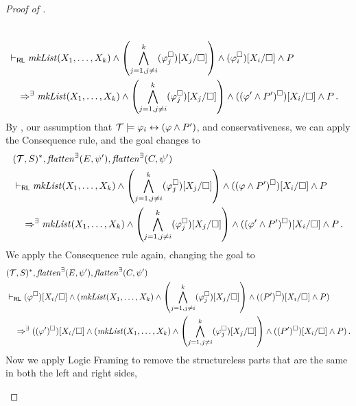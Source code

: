 \begin{proof}[Proof of ]
\begin{enumerate}
\begin{align*}
        \\& \vdash_{\mathsf{RL}}
        \mathit{mkList}(X_1, \ldots, X_k) \land \left( \bigwedge_{j=1,j\not = i}^{k} (\varphi_j^\square)[X_j/\square] \right)
        \land (\varphi_i^\square)[X_i/\square] \land P
        \\&\quad \Rightarrow^\exists
        \mathit{mkList}(X_1, \ldots, X_k) \land \left( \bigwedge_{j=1, j \not = i}^{k} (\varphi_j^\square)[X_j/\square] \right) \land ((\varphi^\prime \land P^\prime)^\square)[X_i/\square] \land P
        \, .
    \end{align*}
    By , our assumption that $\mathcal{T} \models \varphi_i \leftrightarrow (\varphi \land P^\prime)$,
    and conservativeness,
    we can apply the Consequence rule, and the goal changes to
    \begin{align*}
        & (\mathcal{T}, S)^*, \mathit{flatten}^\exists(E, \psi^\prime), \mathit{flatten}^\exists(C, \psi^\prime)
        \\& \vdash_{\mathsf{RL}}
        \mathit{mkList}(X_1, \ldots, X_k) \land \left( \bigwedge_{j=1,j\not = i}^{k} (\varphi_j^\square)[X_j/\square] \right)
        \land ((\varphi \land P^\prime)^\square)[X_i/\square] \land P
        \\&\quad \Rightarrow^\exists
        \mathit{mkList}(X_1, \ldots, X_k) \land \left( \bigwedge_{j=1, j \not = i}^{k} (\varphi_j^\square)[X_j/\square] \right) \land ((\varphi^\prime \land P^\prime)^\square)[X_i/\square] \land P
        \, .
    \end{align*}
    We apply the Consequence rule again, changing the goal to
    \begin{align*}
        & (\mathcal{T}, S)^*, \mathit{flatten}^\exists(E, \psi^\prime), \mathit{flatten}^\exists(C, \psi^\prime)
        \\& \vdash_{\mathsf{RL}}
        (\varphi^\square)[X_i/\square] \land (
        \mathit{mkList}(X_1, \ldots, X_k) \land \left( \bigwedge_{j=1,j\not = i}^{k} (\varphi_j^\square)[X_j/\square] \right)
        \land ((P^\prime)^\square)[X_i/\square] \land P)
        \\&\quad \Rightarrow^\exists
        ((\varphi^\prime)^\square)[X_i/\square] \land (
        \mathit{mkList}(X_1, \ldots, X_k) \land \left( \bigwedge_{j=1, j \not = i}^{k} (\varphi_j^\square)[X_j/\square] \right) \land ((P^\prime)^\square)[X_i/\square] \land P)
        \, .
    \end{align*}
    Now we apply Logic Framing to remove the structureless parts that are the same in both the left and right sides,

\end{enumerate}
\end{proof}
